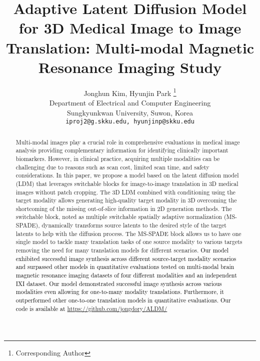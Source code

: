 \documentclass[10pt,twocolumn,letterpaper]{article}
\newcommand{\jhk}[2]{\textcolor{black}{{}#2}}
\begin{document}
\title{Adaptive Latent Diffusion Model for 3D Medical Image to Image Translation: Multi-modal Magnetic Resonance Imaging Study}
\author{
    Jonghun Kim, \quad
    Hyunjin Park \thanks{Corresponding Author} \\
    Department of Electrical and Computer Engineering \\
    Sungkyunkwan University, Suwon, Korea \\
    {\tt\small iproj2@g.skku.edu, hyunjinp@skku.edu}
}

\maketitle
\thispagestyle{empty}

\begin{abstract}
   Multi-modal images play a crucial role in comprehensive evaluations in medical image analysis providing complementary information for identifying clinically important biomarkers. However, in clinical practice, acquiring multiple modalities can be challenging due to reasons such as scan cost, limited scan time, and safety considerations.  In this paper, we propose a model based on the latent diffusion model (LDM) that leverages switchable blocks for image-to-image translation in 3D medical images without patch cropping.  The 3D LDM combined with conditioning using the target modality allows generating high-quality target modality in 3D overcoming the shortcoming of the missing out-of-slice information in 2D generation methods. The switchable block, noted as multiple switchable spatially adaptive normalization (MS-SPADE), dynamically transforms source latents to the desired style of the target latents to help with the diffusion process. The MS-SPADE block allows us to have one single model to tackle many translation tasks of one source modality to various targets removing the need for many translation models for different scenarios. \jhk{}{Our model exhibited successful image synthesis across different source-target modality scenarios and surpassed other models in quantitative evaluations tested on multi-modal brain magnetic resonance imaging datasets of four different modalities and an independent IXI dataset.  Our model demonstrated successful image synthesis across various modalities even allowing for one-to-many modality translations. Furthermore, it outperformed other one-to-one translation models in quantitative evaluations. Our code is available at \url{https://github.com/jongdory/ALDM/}}
\end{abstract}
\end{document}
